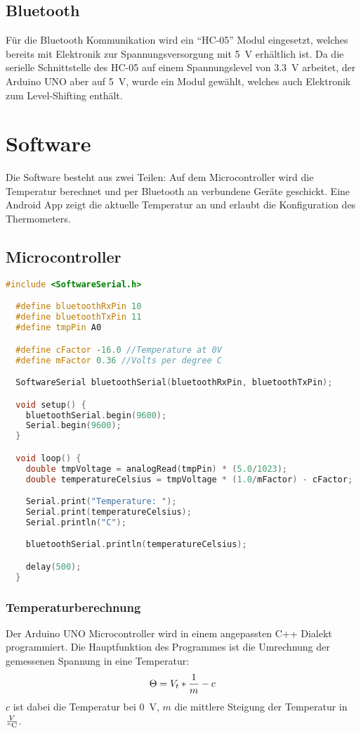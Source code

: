 \documentclass{article}
\begin{document}
\subsection{Bluetooth}

Für die Bluetooth Kommunikation wird ein \enquote{HC-05} Modul eingesetzt,
welches bereits mit Elektronik zur Spannungsversorgung mit \SI{5}{\volt}
erhältlich ist. Da die serielle Schnittstelle des HC-05 auf einem Spannungslevel
von \SI{3.3}{\volt} arbeitet, der Arduino UNO aber auf \SI{5}{\volt}, wurde
ein Modul gewählt, welches auch Elektronik zum Level-Shifting enthält.


\section{Software}

Die Software besteht aus zwei Teilen: Auf dem Microcontroller wird die
Temperatur berechnet und per Bluetooth an verbundene Geräte geschickt. Eine
Android App zeigt die aktuelle Temperatur an und erlaubt die Konfiguration des
Thermometers.

\subsection{Microcontroller}

  \begin{lstlisting}[language=C++, caption={Arduino code}]
  #include <SoftwareSerial.h>

  #define bluetoothRxPin 10
  #define bluetoothTxPin 11
  #define tmpPin A0

  #define cFactor -16.0 //Temperature at 0V
  #define mFactor 0.36 //Volts per degree C

  SoftwareSerial bluetoothSerial(bluetoothRxPin, bluetoothTxPin);

  void setup() {
    bluetoothSerial.begin(9600);
    Serial.begin(9600);
  }

  void loop() {
    double tmpVoltage = analogRead(tmpPin) * (5.0/1023);
    double temperatureCelsius = tmpVoltage * (1.0/mFactor) - cFactor;

    Serial.print("Temperature: ");
    Serial.print(temperatureCelsius);
    Serial.println("C");

    bluetoothSerial.println(temperatureCelsius);

    delay(500);
  }
  \end{lstlisting}

  \subsubsection{Temperaturberechnung}
    Der Arduino UNO Microcontroller wird in einem angepassten C++ Dialekt
    programmiert. Die Hauptfunktion des Programmes ist die Umrechnung der gemessenen
    Spannung in eine Temperatur:
    \[
    \Theta = V_{t} * {1 \over m} - c
    \]
    $c$ ist dabei die Temperatur bei \SI{0}{\volt}, $m$ die mittlere Steigung der
    Temperatur in $V \over \si{\degreeCelsius}$.
\end{document}
